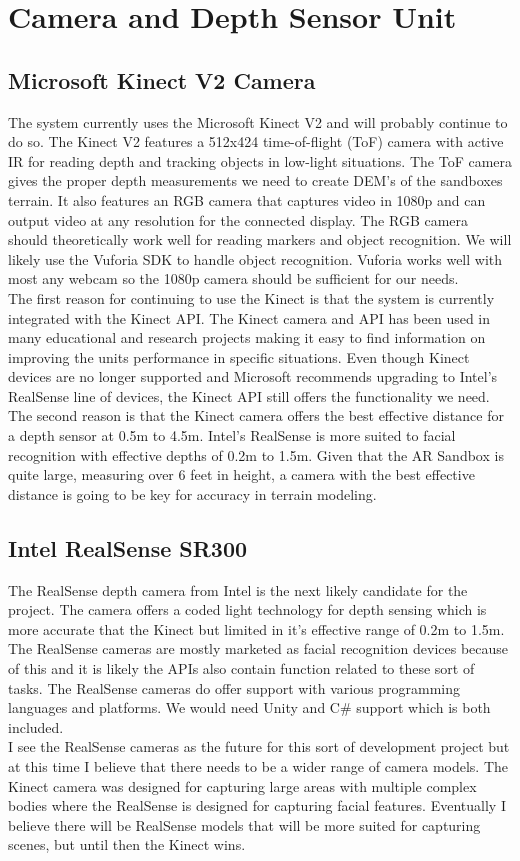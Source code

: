 \documentclass[letterpaper, 10pt, onecolumn, draftclsnofoot]{IEEEtran}
\begin{document}
\section{Camera and Depth Sensor Unit}
    \subsection{Microsoft Kinect V2 Camera}
    The system currently uses the Microsoft Kinect V2 and will probably continue to do so. The Kinect V2 features a 512x424 time-of-flight (ToF) camera with active IR for reading depth and tracking objects in low-light situations. The ToF camera gives the proper depth measurements we need to create DEM’s of the sandboxes terrain. It also features an RGB camera that captures video in 1080p and can output video at any resolution for the connected display. The RGB camera should theoretically work well for reading markers and object recognition. We will likely use the Vuforia SDK to handle object recognition. Vuforia works well with most any webcam so the 1080p camera should be sufficient for our needs.\\
    The first reason for continuing to use the Kinect is that the system is currently integrated with the Kinect API. The Kinect camera and API has been used in many educational and research projects making it easy to find information on improving the units performance in specific situations. Even though Kinect devices are no longer supported and Microsoft recommends upgrading to Intel's RealSense line of devices, the Kinect API still offers the functionality we need.\\ 
    The second reason is that the Kinect camera offers the best effective distance for a depth sensor at 0.5m to 4.5m. Intel’s RealSense is more suited to facial recognition with effective depths of 0.2m to 1.5m. Given that the AR Sandbox is quite large, measuring over 6 feet in height, a camera with the best effective distance is going to be key for accuracy in terrain modeling.
    
    \subsection{Intel RealSense SR300}
    The RealSense depth camera from Intel is the next likely candidate for the project. The camera offers a coded light technology for depth sensing which is more accurate that the Kinect but limited in it’s effective range of 0.2m to 1.5m. The RealSense cameras are mostly marketed as facial recognition devices because of this and it is likely the APIs also contain function related to these sort of tasks. The RealSense cameras do offer support with various programming languages and platforms. We would need Unity and C\# support which is both included.\\
    I see the RealSense cameras as the future for this sort of development project but at this time I believe that there needs to be a wider range of camera models. The Kinect camera was designed for capturing large areas with multiple complex bodies where the RealSense is designed for capturing facial features. Eventually I believe there will be RealSense models that will be more suited for capturing scenes, but until then the Kinect wins.
\end{document}

